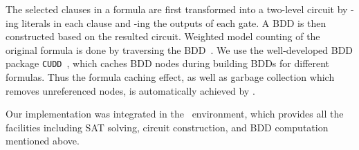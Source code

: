 The selected clauses in a formula are first transformed into a two-level circuit by \disjoin-ing literals in each clause and \conjoin-ing the outputs of each \disjoin gate.
A BDD is then constructed based on the resulted circuit.
Weighted model counting of the original formula is done by traversing the BDD~\cite{LeeTC18ProbDesign}.
We use the well-developed BDD package \texttt{CUDD}~\cite{CUDD},
which caches BDD nodes during building BDDs for different formulas.
Thus the formula caching effect,
as well as garbage collection which removes unreferenced nodes,
is automatically achieved by \cudd.

Our implementation was integrated in the \abc~\cite{ABC}environment,
which provides all the facilities including SAT solving, circuit construction, and BDD computation mentioned above.